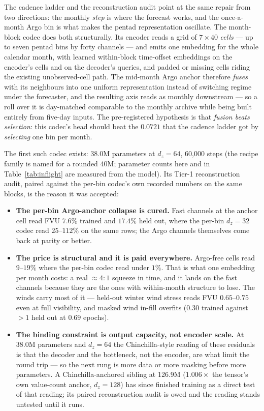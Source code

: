 \documentclass[10pt]{article}
\begin{document}
The cadence ladder and the reconstruction audit point at the same repair
from two directions: the monthly \emph{step} is where the forecast works,
and the once-a-month Argo bin is what makes the pentad representation
oscillate. The month-block codec does both structurally. Its encoder reads a
grid of $7 \times 40$ \emph{cells} --- up to seven pentad bins by forty
channels --- and emits one embedding for the whole calendar month, with
learned within-block time-offset embeddings on the encoder's cells and on
the decoder's queries, and padded or missing cells riding the existing
unobserved-cell path. The mid-month Argo anchor therefore \emph{fuses} with
its neighbours into one uniform representation instead of switching regime
under the forecaster, and the resulting axis reads as monthly downstream ---
so a roll over it is day-matched comparable to the monthly archive while
being built entirely from five-day inputs. The pre-registered hypothesis is
that \emph{fusion beats selection}: this codec's head should beat the
$0.0721$ that the cadence ladder got by \emph{selecting} one bin per month.

The first such codec exists: 38.0M parameters at $d_z{=}64$, 60{,}000 steps
(the recipe family is named for a rounded 40M; parameter counts here and in
Table~\ref{tab:inflight} are measured from the model).
Its Tier-1 reconstruction audit, paired against the per-bin codec's own
recorded numbers on the same blocks, is the reason it was accepted:

\begin{itemize}\itemsep2pt
\item \textbf{The per-bin Argo-anchor collapse is cured.} Fast channels at
  the anchor cell read FVU $7.6\%$ trained and $17.4\%$ held out, where the
  per-bin $d_z{=}32$ codec read $25$--$112\%$ on the same rows; the Argo
  channels themselves come back at parity or better.
\item \textbf{The price is structural and it is paid everywhere.} Argo-free
  cells read $9$--$19\%$ where the per-bin codec read under $1\%$. That is
  what one embedding per month costs: a real $\approx$$4{:}1$ squeeze in
  time, and it lands on the fast channels because they are the ones with
  within-month structure to lose. The winds carry most of it --- held-out
  winter wind stress reads FVU $0.65$--$0.75$ even at full visibility, and
  masked wind in-fill overfits ($0.30$ trained against $>$$1$ held out at
  $0.69$ epochs).
\item \textbf{The binding constraint is output capacity, not encoder
  scale.} At 38.0M parameters and $d_z{=}64$ the Chinchilla-style reading of
  these residuals is that the decoder and the bottleneck, not the encoder,
  are what limit the round trip --- so the next rung is more data or more
  masking before more parameters. A Chinchilla-anchored sibling at 126.9M
  ($1.006\times$ the tensor's own value-count anchor, $d_z{=}128$) has
  since finished training as a direct test of that reading; its paired
  reconstruction audit is owed and the reading stands untested until it
  runs.
\end{itemize}
\end{document}
